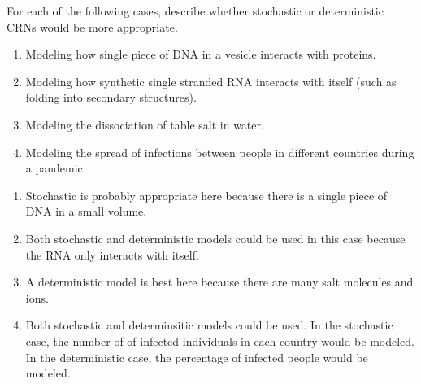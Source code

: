 \begin{popquiz}[label=pq:crn:stoch]
  For each of the following cases, describe whether stochastic or deterministic CRNs would be more appropriate.
  \begin{enumerate}[label=\alph*.]
    \item Modeling how single piece of DNA in a vesicle interacts with proteins.
    \item Modeling how synthetic single stranded RNA interacts with itself (such as folding into secondary structures).
    \item Modeling the dissociation of table salt in water.
    \item Modeling the spread of infections between people in different countries during a pandemic
  \end{enumerate}
\solution
  \begin{enumerate}[label=\alph*.]
    \item Stochastic is probably appropriate here because there is a single piece of DNA in a small volume.
    \item Both stochastic and deterministic models could be used in this case because the RNA only interacts with itself.
    \item A deterministic model is best here because there are many salt molecules and ions.
    \item Both stochastic and determinsitic models could be used. In the stochastic case, the number of of infected individuals in each country would be modeled. In the deterministic case, the percentage of infected people would be modeled. 
  \end{enumerate}
\end{popquiz}



